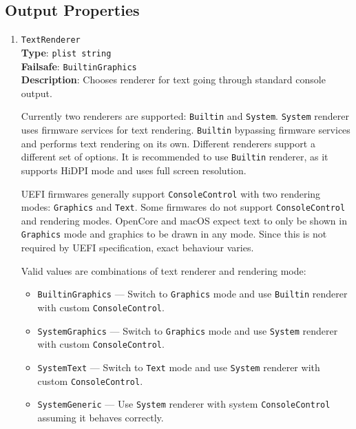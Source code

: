 \documentclass[]{article}
\providecommand{\tightlist}{%
  \setlength{\itemsep}{0pt}\setlength{\parskip}{0pt}}
\begin{document}
\subsection{Output Properties}\label{uefioutputprops}

\begin{enumerate}

\item
  \texttt{TextRenderer}\\
  \textbf{Type}: \texttt{plist\ string}\\
  \textbf{Failsafe}: \texttt{BuiltinGraphics}\\
  \textbf{Description}: Chooses renderer for text going through standard
  console output.

  Currently two renderers are supported: \texttt{Builtin} and
  \texttt{System}. \texttt{System} renderer uses firmware services
  for text rendering. \texttt{Builtin} bypassing firmware services
  and performs text rendering on its own. Different renderers support
  a different set of options. It is recommended to use \texttt{Builtin}
  renderer, as it supports HiDPI mode and uses full screen resolution.

  UEFI firmwares generally support \texttt{ConsoleControl} with two
  rendering modes: \texttt{Graphics} and \texttt{Text}. Some firmwares
  do not support \texttt{ConsoleControl} and rendering modes. OpenCore
  and macOS expect text to only be shown in \texttt{Graphics} mode and
  graphics to be drawn in any mode. Since this is not required by UEFI
  specification, exact behaviour varies.

  Valid values are combinations of text renderer and rendering mode:

  \begin{itemize}
  \tightlist
  \item \texttt{BuiltinGraphics} --- Switch to \texttt{Graphics}
    mode and use \texttt{Builtin} renderer with
    custom \texttt{ConsoleControl}.
  \item \texttt{SystemGraphics} --- Switch to \texttt{Graphics}
    mode and use \texttt{System} renderer with
    custom \texttt{ConsoleControl}.
  \item \texttt{SystemText} --- Switch to \texttt{Text}
    mode and use \texttt{System} renderer with
    custom \texttt{ConsoleControl}.
  \item \texttt{SystemGeneric} --- Use \texttt{System} renderer with
    system \texttt{ConsoleControl} assuming it behaves correctly.
  \end{itemize}


\end{enumerate}
\end{document}
